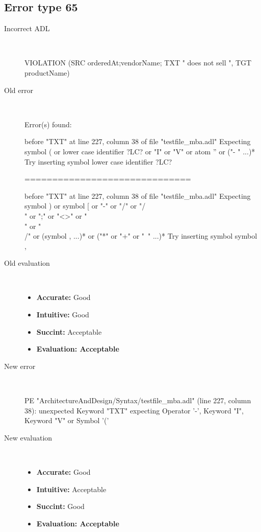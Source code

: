 \hrulefill

\subsection{Error type 65}
  \begin{description}
  \item[Incorrect ADL]~\\
\begin{adl}
VIOLATION (SRC orderedAt;vendorName; TXT " does not sell ", TGT productName)\end{adl}
  \item[Old error]~\\
\begin{haskell}
Error(s) found:

before "TXT" at line 227, column 38 of file "testfile_mba.adl"
Expecting symbol ( or lower case identifier ?LC? or "I" or "V" or atom '' or ("-
" ...)*
Try inserting symbol lower case identifier ?LC?

==============================

before "TXT" at line 227, column 38 of file "testfile_mba.adl"
Expecting symbol ) or symbol [ or "-" or "/" or "/\\" or ";" or "<>" or "\\" or
"\\/" or (symbol , ...)* or ("*" or "+" or "~" ...)*
Try inserting symbol symbol ,
\end{haskell}
  \item[Old evaluation]~\\
    \begin{itemize}
    \item \textbf{Accurate:} Good
    \item \textbf{Intuitive:} Good
    \item \textbf{Succint:} Acceptable
    \item \textbf{Evaluation: Acceptable}
    \end{itemize}
  \item[New error]~\\
\begin{haskell}
PE "ArchitectureAndDesign/Syntax/testfile_mba.adl" (line 227, column 38):
unexpected Keyword "TXT"
expecting Operator '-', Keyword "I", Keyword "V" or Symbol '('\end{haskell}
  \item[New evaluation]~\\
    \begin{itemize}
    \item \textbf{Accurate:} Good
    \item \textbf{Intuitive:} Acceptable
    \item \textbf{Succint:} Good
    \item \textbf{Evaluation: Acceptable
}
    \end{itemize}
  \end{description}


